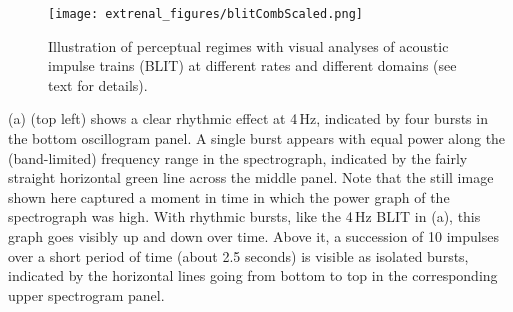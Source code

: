 \begin{figure}
\texttt{[image: extrenal\_figures/blitCombScaled.png]} 
\caption{Illustration of perceptual regimes with visual analyses of acoustic impulse trains (BLIT) at different rates and different domains (see text for details).}\label{fig:priors-blit}
\end{figure}

(a) (top left) shows a clear rhythmic effect at 4\,Hz, indicated by four bursts in the bottom oscillogram panel. A single burst appears with equal power along the (band-limited) frequency range in the spectrograph, indicated by the fairly straight horizontal green line across the middle panel.
Note that the still image shown here captured a moment in time in which the power graph of the spectrograph was high. With rhythmic bursts, like the 4\,Hz BLIT in (a), this graph goes visibly up and down over time. Above it, a succession of 10 impulses over a short period of time (about 2.5 seconds) is visible as isolated bursts, indicated by the horizontal lines going from bottom to top in the corresponding upper spectrogram panel.

